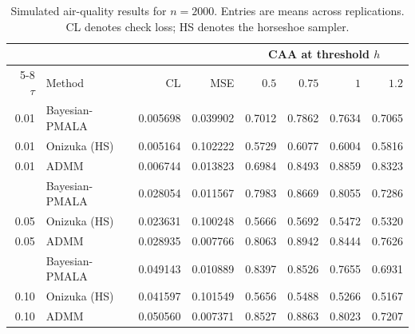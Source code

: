 \begin{table}[H]
\centering
\small
\setlength{\tabcolsep}{4pt}
\caption{Simulated air-quality results for $n=2000$. Entries are means across replications. CL denotes check loss; HS denotes the horseshoe sampler.}
\label{tab:air_n2000}
\begin{tabular}{@{}rlrrrrrr@{}}
\toprule
 & & & & \multicolumn{4}{c}{CAA at threshold $h$} \\
\cmidrule(lr){5-8}
$\tau$ & Method & CL & MSE & $0.5$ & $0.75$ & $1$ & $1.2$ \\
\midrule
0.01 & Bayesian-PMALA & 0.005698 & 0.039902 & 0.7012 & 0.7862 & 0.7634 & 0.7065 \\
0.01 & Onizuka (HS) & 0.005164 & 0.102222 & 0.5729 & 0.6077 & 0.6004 & 0.5816 \\
0.01 & ADMM & 0.006744 & 0.013823 & 0.6984 & 0.8493 & 0.8859 & 0.8323 \\
\addlinespace[3pt]
0.05 & Bayesian-PMALA & 0.028054 & 0.011567 & 0.7983 & 0.8669 & 0.8055 & 0.7286 \\
0.05 & Onizuka (HS) & 0.023631 & 0.100248 & 0.5666 & 0.5692 & 0.5472 & 0.5320 \\
0.05 & ADMM & 0.028935 & 0.007766 & 0.8063 & 0.8942 & 0.8444 & 0.7626 \\
\addlinespace[3pt]
0.10 & Bayesian-PMALA & 0.049143 & 0.010889 & 0.8397 & 0.8526 & 0.7655 & 0.6931 \\
0.10 & Onizuka (HS) & 0.041597 & 0.101549 & 0.5656 & 0.5488 & 0.5266 & 0.5167 \\
0.10 & ADMM & 0.050560 & 0.007371 & 0.8527 & 0.8863 & 0.8023 & 0.7207 \\
\bottomrule
\end{tabular}
\end{table}

